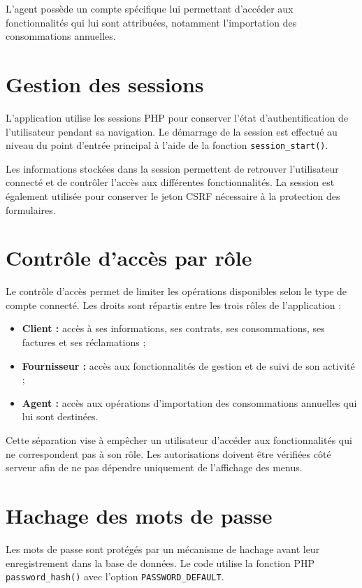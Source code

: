 L'agent possède un compte spécifique lui permettant d'accéder aux fonctionnalités qui lui sont attribuées, notamment l'importation des consommations annuelles.

\section{Gestion des sessions}

L'application utilise les sessions PHP pour conserver l'état d'authentification de l'utilisateur pendant sa navigation. Le démarrage de la session est effectué au niveau du point d'entrée principal à l'aide de la fonction \texttt{session\_start()}.

Les informations stockées dans la session permettent de retrouver l'utilisateur connecté et de contrôler l'accès aux différentes fonctionnalités. La session est également utilisée pour conserver le jeton CSRF nécessaire à la protection des formulaires.

\section{Contrôle d'accès par rôle}

Le contrôle d'accès permet de limiter les opérations disponibles selon le type de compte connecté. Les droits sont répartis entre les trois rôles de l'application :

\begin{itemize}[leftmargin=*]
    \item \textbf{Client :} accès à ses informations, ses contrats, ses consommations, ses factures et ses réclamations ;
    \item \textbf{Fournisseur :} accès aux fonctionnalités de gestion et de suivi de son activité ;
    \item \textbf{Agent :} accès aux opérations d'importation des consommations annuelles qui lui sont destinées.
\end{itemize}

Cette séparation vise à empêcher un utilisateur d'accéder aux fonctionnalités qui ne correspondent pas à son rôle. Les autorisations doivent être vérifiées côté serveur afin de ne pas dépendre uniquement de l'affichage des menus.

\section{Hachage des mots de passe}

Les mots de passe sont protégés par un mécanisme de hachage avant leur enregistrement dans la base de données. Le code utilise la fonction PHP \texttt{password\_hash()} avec l'option \texttt{PASSWORD\_DEFAULT}.

